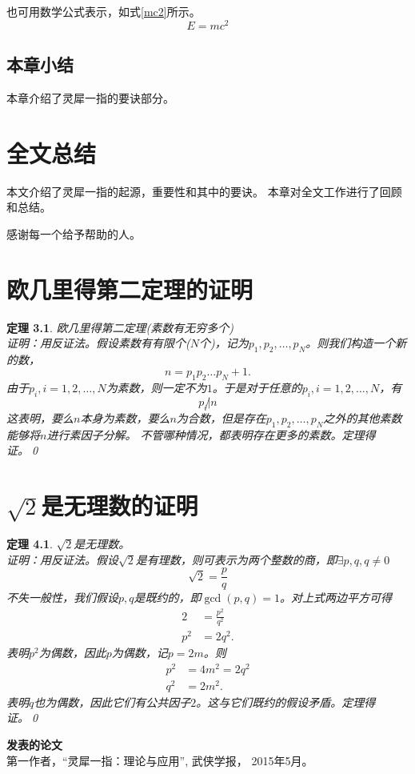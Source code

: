 \documentclass[algorithmlist, figurelist,tablelist, nomlist,masters]{seuthesix}
\begin{document}
也可用数学公式表示，如式\ref{mc2}所示。
\begin{equation}
E=mc^2
\label{mc2}
\end{equation}

\section{本章小结}
本章介绍了灵犀一指的要诀部分。




\chapter{全文总结}
本文介绍了灵犀一指的起源，重要性和其中的要诀。
本章对全文工作进行了回顾和总结。

\acknowledgement
感谢每一个给予帮助的人。



\appendix

\chapter{欧几里得第二定理的证明}
\newtheorem{theorem}{定理}
\begin{theorem}
欧几里得第二定理(素数有无穷多个)\\
证明：用反证法。假设素数有有限个($N$个)，记为$p_1,p_2,\dots,p_N$。则我们构造一个新的数，
\[
n=p_1p_2\dots p_N+1.
\]
由于$p_i,i=1,2,\dots,N$为素数，则一定不为$1$。于是对于任意的$p_i,i=1,2,\dots, N$，有
\[
p_i\not|n
\]
这表明，要么$n$本身为素数，要么$n$为合数，但是存在$p_1,p_2,\dots,p_N$之外的其他素数能够将$n$进行素因子分解。
不管哪种情况，都表明存在更多的素数。定理得证。\qed
\end{theorem}

\chapter{$\sqrt{2}$是无理数的证明}
\begin{theorem}
$\sqrt{2}$是无理数。\\
证明：用反证法。假设$\sqrt{2}$是有理数，则可表示为两个整数的商，即$\exists p,q, q\ne0$
\[
\sqrt{2}=\frac{p}{q}
\]
不失一般性，我们假设$p,q$是既约的，即$\gcd(p,q)=1$。对上式两边平方可得\\
\begin{align*}
2& =\frac{p^2}{q^2}\\
p^2&=2q^2.
\end{align*}
表明$p^2$为偶数，因此$p$为偶数，记$p=2m$。则
\begin{align*}
p^2&=4m^2=2q^2\\
q^2&=2m^2.
\end{align*}
表明$q$也为偶数，因此它们有公共因子$2$。这与它们既约的假设矛盾。定理得证。\qed
\end{theorem}

\begin{flushleft}
{\bfseries \large 发表的论文}\\ \relax
[1] 第一作者，“灵犀一指：理论与应用”, 武侠学报，
2015年5月。\\
\end{flushleft}
\end{document}
